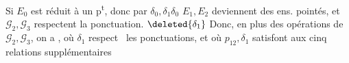 Si $E_0$ est réduit à un p\textsuperscript{t}, donc par $\delta_0,\delta_1\delta_0$ $E_1,E_2$ deviennent des ens. pointés, et $\mathcal G_2,\mathcal G_3$ respectent la ponctuation.
$\deleted{\delta_1}$ 
Donc, en plus des opérations de $\mathcal G_2,\mathcal G_3$, on a
, où $\delta_1$  respect%
\ les ponctuations, et où $p_{12},\delta_1$ satisfont aux cinq relations supplémentaires
